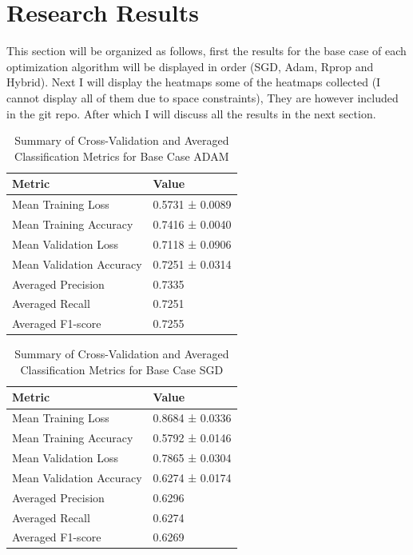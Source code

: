 \documentclass[conference]{IEEEtran}
\begin{document}
\section{Research Results}
This section will be organized as follows, first the results for the base case of each optimization algorithm will be displayed in order (SGD, Adam, Rprop and Hybrid). Next I will display the heatmaps some of the heatmaps collected (I cannot display all of them due to space constraints), They are however included in the git repo. After which I will discuss all the results in the next section.
\begin{table}[h]
    \centering
    \caption{Summary of Cross-Validation and Averaged Classification Metrics for Base Case ADAM}
    \begin{tabular}{@{}ll@{}}
        \toprule
        \textbf{Metric}                   & \textbf{Value}           \\ 
        \midrule
        Mean Training Loss       & 0.5731 ± 0.0089 \\ 
        Mean Training Accuracy   & 0.7416 ± 0.0040 \\ 
        Mean Validation Loss     & 0.7118 ± 0.0906 \\ 
        Mean Validation Accuracy  & 0.7251 ± 0.0314 \\ 
        \midrule
        Averaged Precision       & 0.7335 \\ 
        Averaged Recall          & 0.7251 \\ 
        Averaged F1-score        & 0.7255 \\ 
        \bottomrule
    \end{tabular}
    \label{tab:combined_metrics_summary_adam}
\end{table}
\begin{table}[h]
    \centering
    \caption{Summary of Cross-Validation and Averaged Classification Metrics for Base Case SGD}
    \begin{tabular}{@{}ll@{}}
        \toprule
        \textbf{Metric}                   & \textbf{Value}           \\ 
        \midrule
        Mean Training Loss       & 0.8684 ± 0.0336 \\ 
        Mean Training Accuracy   & 0.5792 ± 0.0146 \\ 
        Mean Validation Loss     & 0.7865 ± 0.0304 \\ 
        Mean Validation Accuracy  & 0.6274 ± 0.0174 \\ 
        \midrule
        Averaged Precision       & 0.6296 \\ 
        Averaged Recall          & 0.6274 \\ 
        Averaged F1-score        & 0.6269 \\ 
        \bottomrule
    \end{tabular}
    \label{tab:combined_metrics_summary_sgd}
\end{table}
\end{document}
